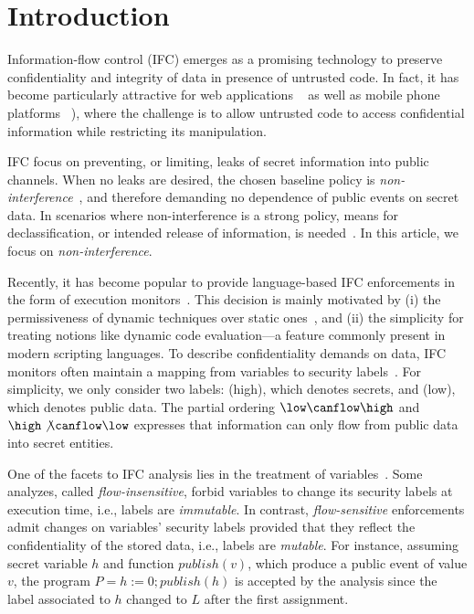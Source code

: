 \section{Introduction}
\label{sec:intro}

Information-flow control (IFC) emerges as a promising technology to preserve
confidentiality and integrity of data in presence of untrusted code.  In fact,
it has become particularly attractive for web applications
~\citep[e.g.][]{DeGroef:2012:FWB:2382196.2382275, giffin:hails, yang:2013:towards,
  conf/esorics/AkhaweLHSS13, Hedin13} as well as mobile phone platforms
~\citep[e.g.][]{Enck:2010,android:esorics13}), where the challenge is to allow
untrusted code to access confidential information while restricting its
manipulation.

IFC focus on preventing, or limiting, leaks of secret information into public
channels. When no leaks are desired, the chosen baseline policy is
\emph{non-interference}~\citep{Goguen:Meseguer:Noninterference}, and therefore
demanding no dependence of public events on secret data. In scenarios where
non-interference is a strong policy, means for declassification, or intended
release of information, is needed~\citep{Sabelfeld:Sands:CSFW05}. In this
article, we focus on \emph{non-interference}. 

Recently, it has become popular to provide language-based IFC enforcements in
the form of execution monitors~\citep{Hedin2011}. This decision is mainly
motivated by (i) the permissiveness of dynamic techniques over static
ones~\citep{Sabelfeld:Russo:PSI09}, and (ii) the simplicity for treating notions
like dynamic code evaluation---a feature commonly present in modern scripting
languages. To describe confidentiality demands on data, IFC monitors often
maintain a mapping from variables to security
labels~\citep{myers:dlm,Stefan:2011}.  For simplicity, we only consider two
labels: \high (high), which denotes secrets, and \low (low), which denotes
public data. The partial ordering $\low \canflow \high$ and $\high \not \canflow
\low$ expresses that information can only flow from public data into secret
entities. 

One of the facets to IFC analysis lies in the treatment of
variables~\citep{Hunt:2006}. Some analyzes, called \emph{flow-insensitive},
forbid variables to change its security labels at execution time, i.e., labels
are \emph{immutable}. In contrast, \emph{flow-sensitive} enforcements admit
changes on variables' security labels provided that they reflect the
confidentiality of the stored data, i.e., labels are \emph{mutable}. For
instance, assuming secret variable $h$ and function $\mathit{publish}(v)$, which
produce a public event of value $v$, the program $P = h := 0 ;
\mathit{publish}(h)$ is accepted by the analysis since the label associated to
$h$ changed to $L$ after the first assignment.

